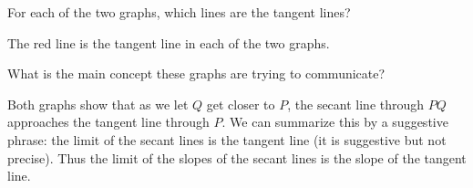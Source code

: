 \documentclass[nooutcomes]{ximera}
\renewenvironment{freeResponse}{
\ifhandout\setbox0\vbox\bgroup\else
\begin{trivlist}\item[\hskip \labelsep\bfseries Solution:\hspace{2ex}]
\fi}
{\ifhandout\egroup\else
\end{trivlist}
\fi}
\begin{document}
\begin{problem}
\begin{itemize}
    \item 
      For each of the two graphs, which lines are the tangent lines?
      \begin{freeResponse}
        The red line is the tangent line in each of the two graphs.        
      \end{freeResponse}

    \item 
      What is the main concept these graphs are trying to communicate?
      \begin{freeResponse}
        Both graphs show that as we let $Q$ get closer to $P$, the secant line through $PQ$ approaches the tangent line through $P$.
        We can summarize this by a suggestive phrase: the limit of the secant lines is the tangent line (it is suggestive but not precise).
        Thus the limit of the slopes of the secant lines is the slope of the tangent line.
      \end{freeResponse}
  \end{itemize}
\end{problem}
\end{document}
